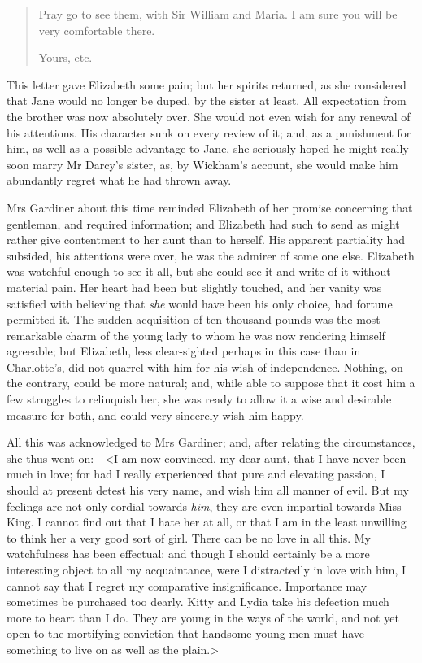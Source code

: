 \begin{quotation}
Pray go to see them, with Sir William and Maria. I am sure you will be very comfortable there.

\begin{flushright}
Yours, etc.
\end{flushright}
\end{quotation}

This letter gave Elizabeth some pain; but her spirits returned, as she considered that Jane would no longer be duped, by the sister at least. All expectation from the brother was now absolutely over. She would not even wish for any renewal of his attentions. His character sunk on every review of it; and, as a punishment for him, as well as a possible advantage to Jane, she seriously hoped he might really soon marry Mr Darcy's sister, as, by Wickham's account, she would make him abundantly regret what he had thrown away.

Mrs Gardiner about this time reminded Elizabeth of her promise concerning that gentleman, and required information; and Elizabeth had such to send as might rather give contentment to her aunt than to herself. His apparent partiality had subsided, his attentions were over, he was the admirer of some one else. Elizabeth was watchful enough to see it all, but she could see it and write of it without material pain. Her heart had been but slightly touched, and her vanity was satisfied with believing that \textit{she} would have been his only choice, had fortune permitted it. The sudden acquisition of ten thousand pounds was the most remarkable charm of the young lady to whom he was now rendering himself agreeable; but Elizabeth, less clear-sighted perhaps in this case than in Charlotte's, did not quarrel with him for his wish of independence. Nothing, on the contrary, could be more natural; and, while able to suppose that it cost him a few struggles to relinquish her, she was ready to allow it a wise and desirable measure for both, and could very sincerely wish him happy.

All this was acknowledged to Mrs Gardiner; and, after relating the circumstances, she thus went on:—<I am now convinced, my dear aunt, that I have never been much in love; for had I really experienced that pure and elevating passion, I should at present detest his very name, and wish him all manner of evil. But my feelings are not only cordial towards \textit{him}, they are even impartial towards Miss King. I cannot find out that I hate her at all, or that I am in the least unwilling to think her a very good sort of girl. There can be no love in all this. My watchfulness has been effectual; and though I should certainly be a more interesting object to all my acquaintance, were I distractedly in love with him, I cannot say that I regret my comparative insignificance. Importance may sometimes be purchased too dearly. Kitty and Lydia take his defection much more to heart than I do. They are young in the ways of the world, and not yet open to the mortifying conviction that handsome young men must have something to live on as well as the plain.>